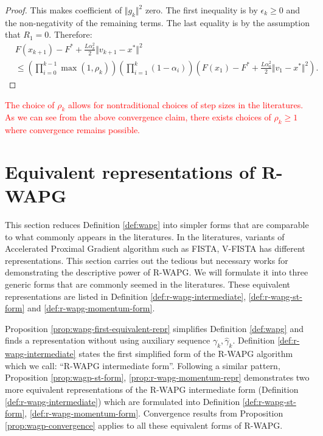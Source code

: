 \documentclass[12pt]{article}
\begin{document}
\begin{proof}
        This makes coefficient of $\Vert g_k\Vert^2$ zero. 
        The first inequality is by $\epsilon_k \ge 0$ and the non-negativity of the remaining terms. 
        The last equality is by the assumption that $R_1 = 0$. 
        Therefore: 
        {\small
        \begin{align*}
            & 
            F(x_{k + 1}) - F^* +
            \frac{L\alpha_k^2}{2}\Vert v_{k + 1} - x^*\Vert^2
            \\
            &\le 
            \left(
                \prod_{i = 0}^{k - 1} \max(1, \rho_{k})
            \right)
            \left(
                \prod_{i = 1}^{k} \left(1  - \alpha_i\right)
            \right)
            \left(
                F(x_1) - F^* + \frac{L\alpha_0^2}{2}\Vert v_1 - x^*\Vert^2
            \right). 
        \end{align*}
        }
    \end{proof}
    \begin{remark}        
        \textcolor{red}
        {
            The choice of $\rho_k$ allows for nontraditional choices of step sizes in the literatures. 
            As we can see from the above convergence claim, there exists choices of $\rho_k\ge 1$ where convergence remains possible. 
        }
    \end{remark}


\section{Equivalent representations of R-WAPG}
    This section reduces Definition \ref{def:wapg} into simpler forms that are comparable to what commonly appears in the literatures. 
    In the literatures, variants of Accelerated Proximal Gradient algorithm such as FISTA, V-FISTA has different representations. 
    This section carries out the tedious but necessary works for demonstrating the descriptive power of R-WAPG. 
    We will formulate it into three generic forms that are commonly seemed in the literatures. 
    These equivalent representations are listed in Definition \ref{def:r-wapg-intermediate}, \ref{def:r-wapg-st-form} and \ref{def:r-wapg-momentum-form}. 
    \par 
    Proposition \ref{prop:wapg-first-equivalent-repr} simplifies Definition \ref{def:wapg} and finds a representation without using auxiliary sequence $\gamma_k, \hat \gamma_k$. 
    Definition \ref{def:r-wapg-intermediate} states the first simplified form of the R-WAPG algorithm which we call: ``R-WAPG intermediate form''. 
    Following a similar pattern, Proposition \ref{prop:wagp-st-form}, \ref{prop:r-wapg-momentum-repr} demonstrates two more equivalent representations of the R-WAPG intermediate form (Definition \ref{def:r-wapg-intermediate}) which are formulated into Definition \ref{def:r-wapg-st-form}, \ref{def:r-wapg-momentum-form}. 
    Convergence results from Proposition \ref{prop:wagp-convergence} applies to all these equivalent forms of R-WAPG. 
    
\end{document}
